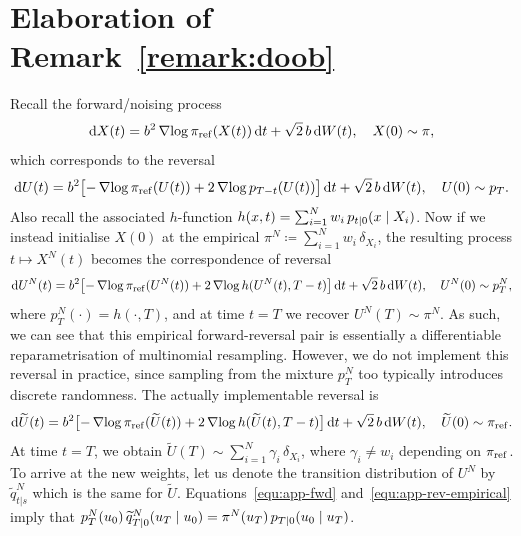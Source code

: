 \documentclass{article}
\begin{document}
\section{Elaboration of Remark~\ref{remark:doob}}
\label{app:elaboration-doob}
Recall the forward/noising process
%
\begin{equation}
    \mathop{}\!\mathrm{d} X(t) = b^2\operatorname{\nabla\!} \log \pi_{\mathrm{ref}}(X(t)) \mathop{}\!\mathrm{d} t + \sqrt{2} \, b \mathop{}\!\mathrm{d} W(t), \quad X(0) \sim \pi,
    \label{equ:app-fwd}
\end{equation}
%
which corresponds to the reversal
%
\begin{equation}
    \mathop{}\!\mathrm{d} U(t) = b^2 \bigl[-\operatorname{\nabla\!} \log \pi_{\mathrm{ref}}(U(t)) + 2\operatorname{\nabla\!}\log p_{T - t}(U(t)) \bigr]\mathop{}\!\mathrm{d} t + \sqrt{2} \, b \mathop{}\!\mathrm{d} W(t), \quad U(0) \sim p_T.
    \label{equ:app-rev-empirical}
\end{equation}
%
Also recall the associated $h$-function $h(x, t) = \sum_{i=1}^N w_i \, p_{t | 0}(x {\;|\;} X_i)$. 
Now if we instead initialise $X(0)$ at the empirical $\pi^N \coloneqq \sum_{i=1}^N w_i \, \delta_{X_i}$, the resulting process $t\mapsto X^N(t)$ becomes the correspondence of reversal
%
\begin{equation}
    \mathop{}\!\mathrm{d} U^N(t) = b^2 \bigl[-\operatorname{\nabla\!} \log \pi_{\mathrm{ref}}(U^N(t)) + 2 \operatorname{\nabla\!} \log h(U^N(t), T - t) \bigr]\mathop{}\!\mathrm{d} t + \sqrt{2} \, b \mathop{}\!\mathrm{d} W(t), \quad U^N(0) \sim p^N_T, 
\end{equation}
%
where $p_T^N(\cdot) = h(\cdot, T)$, and at time $t=T$ we recover $U^N(T) \sim \pi^N$. 
As such, we can see that this empirical forward-reversal pair is essentially a differentiable reparametrisation of multinomial resampling. 
However, we do not implement this reversal in practice, since sampling from the mixture $p_T^N$ too typically introduces discrete randomness. 
The actually implementable reversal is 
%
\begin{equation}
    \mathop{}\!\mathrm{d} \widetilde{U}(t) = b^2 \bigl[-\operatorname{\nabla\!} \log \pi_{\mathrm{ref}}(\widetilde{U}(t)) + 2 \operatorname{\nabla\!} \log h(\widetilde{U}(t), T - t) \bigr]\mathop{}\!\mathrm{d} t + \sqrt{2} \, b \mathop{}\!\mathrm{d} W(t),  \quad   \widetilde{U}(0) \sim \pi_{\mathrm{ref}}. 
\end{equation}
%
At time $t=T$, we obtain $\widetilde{U}(T) \sim \sum_{i=1}^N \gamma_i \, \delta_{X_i}$, where $\gamma_i \neq w_i$ depending on $\pi_{\mathrm{ref}}$. 
To arrive at the new weights, let us denote the transition distribution of $U^N$ by $\widetilde{q}^N_{t | s}$ which is the same for $\widetilde{U}$. 
Equations~\eqref{equ:app-fwd} and~\eqref{equ:app-rev-empirical} imply that $p_T^N(u_0) \, \widetilde{q}^N_{T|0}(u_T {\;|\;} u_0) = \pi^N(u_T)\, p_{T | 0}(u_0 {\;|\;} u_T)$. 
\end{document}
